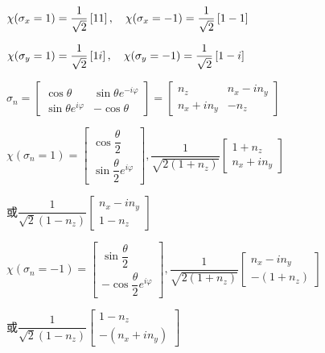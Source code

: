 \achapter


\answer $ \chi(\sigma_{x}=1)=\dfrac{1}{\sqrt{2}}\left[1 \\ 1\right],\quad 		\chi(\sigma_{x}=-1)=\dfrac{1}{\sqrt{2}}\left[1 \\ -1\right] $

		$ \chi(\sigma_{y}=1)=\dfrac{1}{\sqrt{2}}\left[1 \\ i\right],\quad \chi(\sigma_{y}=-1)=\dfrac{1}{\sqrt{2}}\left[1 \\ -i\right] $

\answer $ \sigma_{n}=\begin{bmatrix}
	\cos\theta & \sin\theta e^{-i\varphi} \\
	\sin\theta e^{i\varphi} & -\cos\theta
\end{bmatrix}=\begin{bmatrix}
	n_{z} & n_{x}-in_{y} \\ n_{x}+in_{y} & -n_{z}
\end{bmatrix} $

	$ \chi(\sigma_{n}=1)=\begin{bmatrix}
		\cos\dfrac{\theta}{2} \\ \sin\dfrac{\theta}{2}e^{i\varphi}
	\end{bmatrix},\dfrac{1}{\sqrt{2(1+n_{z})}}\begin{bmatrix}
		1+n_{z} \\ n_{x}+in_{y}
\end{bmatrix} $
	
	或$ \dfrac{1}{\sqrt{2}(1-n_{z})}\begin{bmatrix}
		n_{x}-in_{y} \\ 1-n_{z}
	\end{bmatrix} $
	
	$ \chi(\sigma_{n}=-1)=\begin{bmatrix}
		\sin\dfrac{\theta}{2} \\ -\cos\dfrac{\theta}{2}e^{i\varphi}
	\end{bmatrix},\dfrac{1}{\sqrt{2(1+n_{z})}}\begin{bmatrix}
		n_{x}-in_{y} \\ -(1+n_{z})
	\end{bmatrix} $
	
	或$ \dfrac{1}{\sqrt{2}(1-n_{z})}\begin{bmatrix}
		1-n_{z} \\ -(n_{x}+in_{y})
	\end{bmatrix} $

